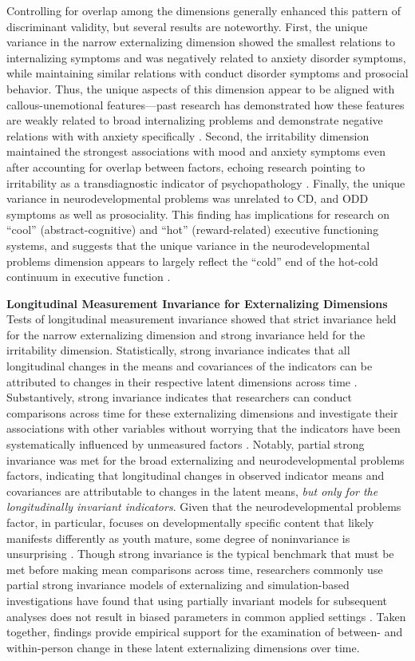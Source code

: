 \documentclass[
  20pt,
  number,
  preprint,
  3p,
  twocolumn]{elsarticle}
\begin{document}
Controlling for overlap among the dimensions generally enhanced this
pattern of discriminant validity, but several results are noteworthy.
First, the unique variance in the narrow externalizing dimension showed
the smallest relations to internalizing symptoms and was negatively
related to anxiety disorder symptoms, while maintaining similar
relations with conduct disorder symptoms and prosocial behavior. Thus,
the unique aspects of this dimension appear to be aligned with
callous-unemotional features---past research has demonstrated how these
features are weakly related to broad internalizing problems
\citep{cardinale2020} and demonstrate negative relations with with
anxiety specifically \citep[e.g.,][]{frick1999}. Second, the
irritability dimension maintained the strongest associations with mood
and anxiety symptoms even after accounting for overlap between factors,
echoing research pointing to irritability as a transdiagnostic indicator
of psychopathology \citep{finlay-jones2023}. Finally, the unique
variance in neurodevelopmental problems was unrelated to CD, and ODD
symptoms as well as prosociality. This finding has implications for
research on ``cool'' (abstract-cognitive) and ``hot'' (reward-related)
executive functioning systems, and suggests that the unique variance in
the neurodevelopmental problems dimension appears to largely reflect the
``cold'' end of the hot-cold continuum in executive function
\citep{zelazo2020}.

\textbf{Longitudinal Measurement Invariance for Externalizing
Dimensions} Tests of longitudinal measurement invariance showed that
strict invariance held for the narrow externalizing dimension and strong
invariance held for the irritability dimension. Statistically, strong
invariance indicates that all longitudinal changes in the means and
covariances of the indicators can be attributed to changes in their
respective latent dimensions across time \citep{grimm2017}.
Substantively, strong invariance indicates that researchers can conduct
comparisons across time for these externalizing dimensions and
investigate their associations with other variables without worrying
that the indicators have been systematically influenced by unmeasured
factors \citep{sidaman2010}. Notably, partial strong invariance was met
for the broad externalizing and neurodevelopmental problems factors,
indicating that longitudinal changes in observed indicator means and
covariances are attributable to changes in the latent means, \emph{but
only for the longitudinally invariant indicators}. Given that the
neurodevelopmental problems factor, in particular, focuses on
developmentally specific content that likely manifests differently as
youth mature, some degree of noninvariance is unsurprising
\citep{petersen2020}. Though strong invariance is the typical benchmark
that must be met before making mean comparisons across time, researchers
commonly use partial strong invariance models of externalizing
\citep[e.g.,][]{king2018} and simulation-based investigations have found
that using partially invariant models for subsequent analyses does not
result in biased parameters in common applied settings \citep{shi2019}.
Taken together, findings provide empirical support for the examination
of between- and within-person change in these latent externalizing
dimensions over time.
\end{document}
